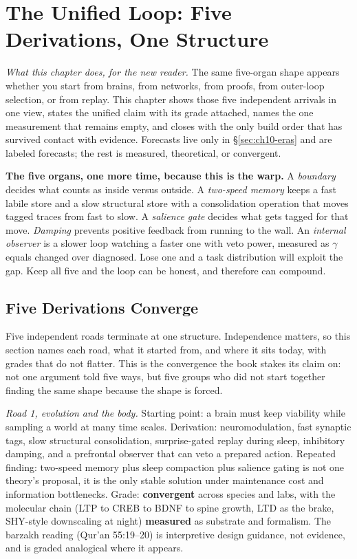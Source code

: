 \chapter{The Unified Loop: Five Derivations, One Structure}
\label{ch:unified}

\begin{center}
\small\textit{What this chapter does, for the new reader.} The same five-organ shape appears whether you start from brains, from networks, from proofs, from outer-loop selection, or from replay. This chapter shows those five independent arrivals in one view, states the unified claim with its grade attached, names the one measurement that remains empty, and closes with the only build order that has survived contact with evidence. Forecasts live only in \S\ref{sec:ch10-eras} and are labeled forecasts; the rest is measured, theoretical, or convergent.\end{center}

\noindent\textbf{The five organs, one more time, because this is the warp.} A \textit{boundary} decides what counts as inside versus outside. A \textit{two-speed memory} keeps a fast labile store and a slow structural store with a consolidation operation that moves tagged traces from fast to slow. A \textit{salience gate} decides what gets tagged for that move. \textit{Damping} prevents positive feedback from running to the wall. An \textit{internal observer} is a slower loop watching a faster one with veto power, measured as $\gamma$ equals changed over diagnosed. Lose one and a task distribution will exploit the gap. Keep all five and the loop can be honest, and therefore can compound.

\section{Five Derivations Converge}
\label{sec:ch10-converge}

Five independent roads terminate at one structure. Independence matters, so this section names each road, what it started from, and where it sits today, with grades that do not flatter. This is the convergence the book stakes its claim on: not one argument told five ways, but five groups who did not start together finding the same shape because the shape is forced.

\textit{Road 1, evolution and the body.} Starting point: a brain must keep viability while sampling a world at many time scales. Derivation: neuromodulation, fast synaptic tags, slow structural consolidation, surprise-gated replay during sleep, inhibitory damping, and a prefrontal observer that can veto a prepared action. Repeated finding: two-speed memory plus sleep compaction plus salience gating is not one theory's proposal, it is the only stable solution under maintenance cost and information bottlenecks. Grade: \textbf{convergent} across species and labs, with the molecular chain (LTP to CREB to BDNF to spine growth, LTD as the brake, SHY-style downscaling at night) \textbf{measured} as substrate and formalism. The barzakh reading (Qur'an 55:19--20) is interpretive design guidance, not evidence, and is graded analogical where it appears.

